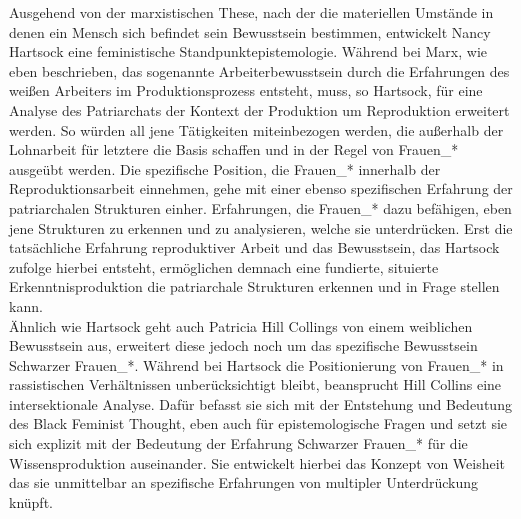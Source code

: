 Ausgehend von der marxistischen These, nach der die materiellen Umstände in
denen ein Mensch sich befindet sein Bewusstsein bestimmen, entwickelt Nancy
Hartsock eine feministische Standpunktepistemologie. Während bei Marx, wie eben
beschrieben, das sogenannte Arbeiterbewusstsein durch die Erfahrungen des
weißen Arbeiters im Produktionsprozess entsteht, muss, so Hartsock, für eine
Analyse des Patriarchats der Kontext der Produktion um Reproduktion erweitert
werden. So würden all jene Tätigkeiten miteinbezogen werden, die außerhalb der
Lohnarbeit für letztere die Basis schaffen und in der Regel von Frauen\_*
ausgeübt werden. Die spezifische Position, die Frauen\_* innerhalb der
Reproduktionsarbeit einnehmen, gehe mit einer ebenso spezifischen Erfahrung der
patriarchalen Strukturen einher. Erfahrungen, die Frauen\_* dazu befähigen, eben
jene Strukturen zu erkennen und zu analysieren, welche sie unterdrücken. Erst
die tatsächliche Erfahrung reproduktiver Arbeit und das Bewusstsein, das
Hartsock zufolge hierbei entsteht, ermöglichen demnach eine fundierte,
situierte Erkenntnisproduktion die patriarchale Strukturen erkennen und in
Frage stellen kann.\footnotemark {}\\ 

Ähnlich wie Hartsock geht auch Patricia Hill Collings von einem weiblichen
Bewusstsein aus, erweitert diese jedoch noch um das spezifische Bewusstsein
Schwarzer Frauen\_*. Während bei Hartsock die Positionierung von Frauen\_* in
rassistischen Verhältnissen unberücksichtigt bleibt, beansprucht Hill Collins
eine intersektionale Analyse. Dafür befasst sie sich mit der Entstehung und
Bedeutung des Black Feminist Thought, eben auch für epistemologische Fragen und
setzt sie sich explizit mit der Bedeutung der Erfahrung Schwarzer Frauen\_* für
die Wissensproduktion auseinander. Sie entwickelt hierbei das Konzept von
Weisheit das sie unmittelbar an spezifische Erfahrungen von multipler
Unterdrückung knüpft.\footnotemark {}\\ 

